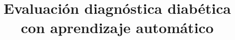 \documentclass[twocolumn]{bmcart}%
\begin{document}
\begin{frontmatter}

\begin{fmbox}


\title{Evaluación diagnóstica diabética con aprendizaje automático }


\author[
   addressref={aff1},                   %
   corref={aff1},                       %
   email={joel.rodarter@uanl.edu.mx}   %
]{ }



\address[id=aff1]{%
  , %
  ,                              %
}



\end{fmbox}
\end{frontmatter}
\end{document}
